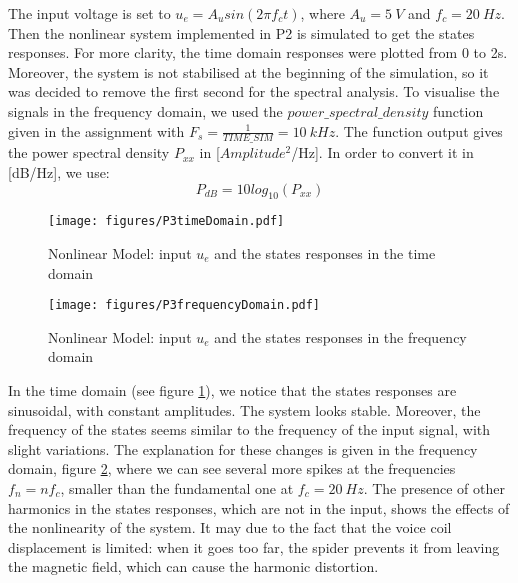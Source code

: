 The input voltage is set to $u_e = A_u sin(2\pi f_c t)$, where $A_u = 5 \ V$ and $f_c = 20 \ Hz$.
Then the nonlinear system implemented in P2 is simulated to get the states responses. For more clarity, the time domain responses were plotted from 0 to 2s. Moreover, the system is not stabilised at the beginning of the simulation, so it was decided to remove the first second for the spectral analysis. To visualise the signals in the frequency domain, we used the \textit{$power\_spectral\_density$} function given in the assignment \cite{assign} with $F_s = \frac{1}{TIME\_SIM} = 10 \ kHz$. The function output gives the power spectral density $P_{xx}$ in [$Amplitude^2$/Hz]. In order to convert it in [dB/Hz], we use: 
\begin{equation*}
P_{dB} = 10log_{10}(P_{xx})
\end{equation*} 

\begin{figure}[H]
 \centering 
 \texttt{[image: figures/P3timeDomain.pdf]}
 \caption{Nonlinear Model: input $u_e$ and the states responses in the time domain}
 \label{fig:NLMt}
\end{figure}

\begin{figure}[H]
 \centering 
 \texttt{[image: figures/P3frequencyDomain.pdf]}
 \caption{Nonlinear Model: input $u_e$ and the states responses in the frequency domain}
 \label{fig:NLMf}
\end{figure}

In the time domain (see figure \ref{fig:NLMt}), we notice that the states responses are sinusoidal, with constant amplitudes. The system looks stable. Moreover, the frequency of the states seems similar to the frequency of the input signal, with slight variations. The explanation for these changes is given in the frequency domain, figure \ref{fig:NLMf}, where we can see several more spikes at the frequencies $f_n = nf_c$, smaller than the fundamental one at $f_c = 20 \ Hz$. The presence of other harmonics in the states responses, which are not in the input, shows the effects of the nonlinearity of the system. It may due to the fact that the voice coil displacement is limited: when it goes too far, the spider prevents it from leaving the magnetic field, which can cause the harmonic distortion. 